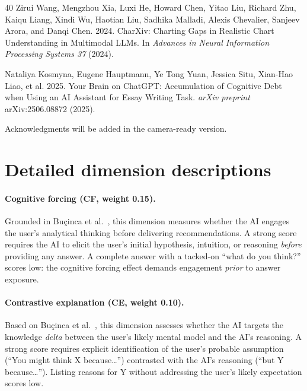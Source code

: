 \documentclass{article}
\begin{document}
\begin{thebibliography}{40}
Zirui Wang, Mengzhou Xia, Luxi He, Howard Chen, Yitao Liu, Richard Zhu, Kaiqu Liang, Xindi Wu, Haotian Liu, Sadhika Malladi, Alexis Chevalier, Sanjeev Arora, and Danqi Chen. 2024.
\newblock CharXiv: Charting Gaps in Realistic Chart Understanding in Multimodal LLMs.
\newblock In \textit{Advances in Neural Information Processing Systems 37} (2024).

Nataliya Kosmyna, Eugene Hauptmann, Ye Tong Yuan, Jessica Situ, Xian-Hao Liao, et al. 2025.
\newblock Your Brain on ChatGPT: Accumulation of Cognitive Debt when Using an AI Assistant for Essay Writing Task.
\newblock \textit{arXiv preprint} arXiv:2506.08872 (2025).

\end{thebibliography}


\begin{ack}
Acknowledgments will be added in the camera-ready version.
\end{ack}


\appendix

\section{Detailed dimension descriptions}
\label{app:dimensions}

\paragraph{Cognitive forcing (CF, weight 0.15).}
Grounded in Bu\c{c}inca et al.\ \cite{bucinca2021trust}, this dimension measures whether the AI engages the user's analytical thinking before delivering recommendations. A strong score requires the AI to elicit the user's initial hypothesis, intuition, or reasoning \emph{before} providing any answer. A complete answer with a tacked-on ``what do you think?'' scores low: the cognitive forcing effect demands engagement \emph{prior} to answer exposure.

\paragraph{Contrastive explanation (CE, weight 0.10).}
Based on Bu\c{c}inca et al.\ \cite{bucinca2024contrastive}, this dimension assesses whether the AI targets the knowledge \emph{delta} between the user's likely mental model and the AI's reasoning. A strong score requires explicit identification of the user's probable assumption (``You might think X because\ldots'') contrasted with the AI's reasoning (``but Y because\ldots''). Listing reasons for Y without addressing the user's likely expectation scores low.
\end{document}
